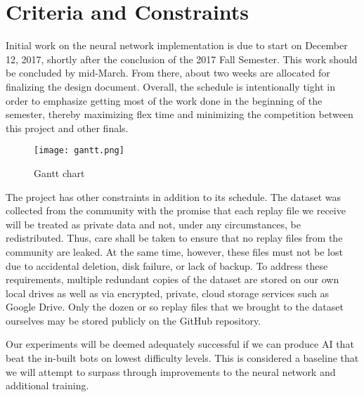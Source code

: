 


\section{Criteria and Constraints}

Initial work on the neural network implementation is due to start on December 12, 2017, shortly after the conclusion of the 2017 Fall Semester. This work should be concluded by mid-March. From there, about two weeks are allocated for finalizing the design document. Overall, the schedule is intentionally tight in order to emphasize getting most of the work done in the beginning of the semester, thereby maximizing flex time and minimizing the competition between this project and other finals.

\begin{figure}
	\caption{Gantt chart}
	\centering
	\texttt{[image: gantt.png]} \\
\end{figure}

The project has other constraints in addition to its schedule. The dataset was collected from the community with the promise that each replay file we receive will be treated as private data and not, under any circumstances, be redistributed. Thus, care shall be taken to ensure that no replay files from the community are leaked. At the same time, however, these files must not be lost due to accidental deletion, disk failure, or lack of backup. To address these requirements, multiple redundant copies of the dataset are stored on our own local drives as well as via encrypted, private, cloud storage services such as Google Drive. Only the dozen or so replay files that we brought to the dataset ourselves may be stored publicly on the GitHub repository.

Our experiments will be deemed adequately successful if we can produce AI that beat the in-built bots on lowest difficulty levels. This is considered a baseline that we will attempt to surpass through improvements to the neural network and additional training.

